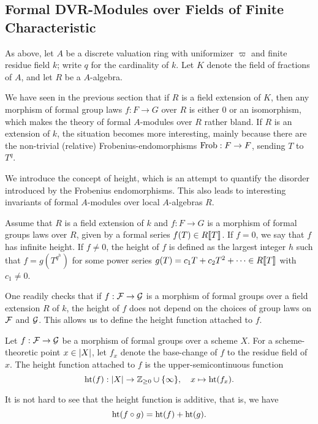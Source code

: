 \documentclass[../main.tex]{subfiles}
\begin{document}
\subsection{Formal DVR-Modules over Fields of Finite Characteristic} %
\label{sub:Formal DVR-Modules over Fields}
As above, let $A$ be a discrete valuation ring with uniformizer $\varpi$ and finite 
residue field $k$; write $q$ for the cardinality of $k$. Let $K$ denote the
field of fractions of $A$, and let $R$ be a $A$-algebra. 

We have seen in the previous section that if $R$ is a field extension of $K$,
then any morphism of formal group laws $f: F \to G$ over $R$ is either $0$
or an isomorphism, which makes the theory of formal $A$-modules over $R$ rather
bland. If $R$ is an extension of $k$, the situation becomes more interesting,
mainly because there are the non-trivial (relative)
Frobenius-endomorphisms $\mathrm{Frob}: F \to F$, sending $T$ to $T^q$. 

We introduce the concept of height, which is an attempt to quantify the disorder
introduced by the Frobenius endomorphisms. This also leads to interesting
invariants of formal $A$-modules over local $A$-algebras $R$.

\begin{defi}
  Assume that $R$ is a field extension of $k$ and $f: F \to G$ is a morphism of 
  formal groups laws over $R$, given by a formal series $f(T) \in R\llbracket T \rrbracket$. 
  If $f = 0$, we say that $f$ has infinite height. 
  If $f \neq 0$, the height of $f$ is defined as the largest integer $h$ such that 
  $f = g(T^{q^h})$ for some power series $g(T) = c_1 T + c_2 T^2 + \dots \in
  R\llbracket T \rrbracket$ with $c_1 \neq 0$. 
\end{defi}
One readily checks that if $f: \mathcal{F} \to \mathcal{G}$ is a morphism of formal groups over
a field extension $R$ of $k$, the height of $f$ does not depend on the choices
of group laws on $\mathcal{F}$ and $\mathcal{G}$. This allows us to define the height function 
attached to $f$. 
\begin{defi}
  Let $f: \mathcal{F} \to \mathcal{G}$ be a morphism of formal groups over a scheme $X$.
  For a scheme-theoretic point $x \in \lvert X \rvert$, let $f_x$ denote the 
  base-change of $f$ to the residue field of $x$. 
  The height function attached to $f$ is the upper-semicontinuous function
  \begin{equation} \label{eq:defheight}
    \textnormal{ht}(f) : \lvert X \rvert \to \mathbb{Z}_{\geq 0} \cup \{\infty\}, \quad x \mapsto 
    \textnormal{ht}(f_x).
  \end{equation}
\end{defi}
It is not hard to see that the height function is additive, that is, we have
\begin{equation*}
  \textnormal{ht}(f \circ g) = \textnormal{ht}(f) + \textnormal{ht}(g).
\end{equation*}
\end{document}
